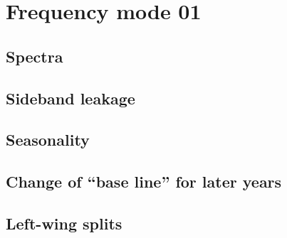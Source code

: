 \section{Frequency mode 01}
\label{FM01}

\subsection{Spectra}
\label{FM01:spectra}

\subsection{Sideband leakage}
\label{FM01:sbl}

\subsection{Seasonality}
\label{FM01:seasonality}

\subsection{Change of ``base line'' for later years}
\label{FM01:baseline}

\subsection{Left-wing splits}
\label{FM01:leftwings}
